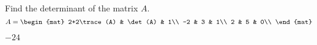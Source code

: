 
\begin{Exercise}[
name={},
title={}, 
difficulty=0,
origin={\cite{YL}}]
Find the determinant of the matrix $A$.
\[A=
\begin{mat}
2+2\trace(A) & \det(A) & 1\\
-2 & 3 & 1\\
2 & 5 & 0\\
\end{mat}
\]
\end{Exercise}
\begin{Answer}
$-24$
\end{Answer}
